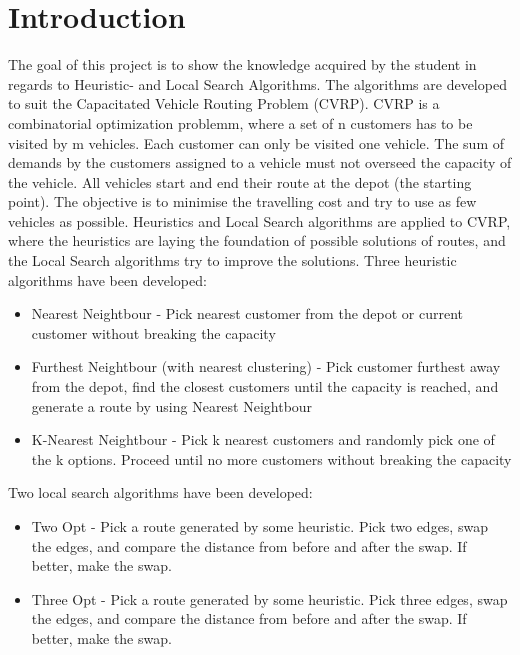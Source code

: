 \documentclass[12pt]{article}
\begin{document}

\section{Introduction}

The goal of this project is to show the knowledge acquired by the student in regards to Heuristic- and Local Search Algorithms. The algorithms are developed to suit the Capacitated Vehicle Routing Problem (CVRP). CVRP is a combinatorial optimization problemm, where a set of n customers has to be visited by m vehicles. Each customer can only be visited one vehicle. The sum of demands by the customers assigned to a vehicle must not overseed the capacity of the vehicle. All vehicles start and end their route at the depot (the starting point). The objective is to minimise the travelling cost and try to use as few vehicles as possible.  
Heuristics and Local Search algorithms are applied to CVRP, where the heuristics are laying the foundation of possible solutions of routes, and the Local Search algorithms try to improve the solutions.  
Three heuristic algorithms have been developed:  
\begin{itemize}
	\item Nearest Neightbour - Pick nearest customer from the depot or current customer without breaking the capacity
	\item Furthest Neightbour (with nearest clustering) - Pick customer furthest away from the depot, find the closest customers until the capacity is reached, and generate a route by using Nearest Neightbour
	\item K-Nearest Neightbour - Pick k nearest customers and randomly pick one of the k options. Proceed until no more customers without breaking the capacity
\end{itemize}  
Two local search algorithms have been developed:  

\begin{itemize}
	\item Two Opt - Pick a route generated by some heuristic. Pick two edges, swap the edges, and compare the distance from before and after the swap. If better, make the swap. 
	\item Three Opt - Pick a route generated by some heuristic. Pick three edges, swap the edges, and compare the distance from before and after the swap. If better, make the swap. 
\end{itemize}
\end{document}
